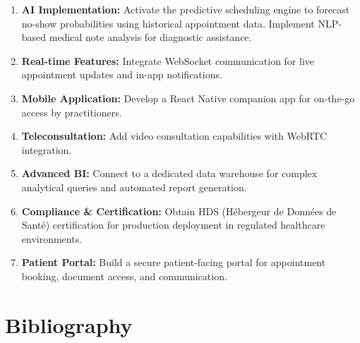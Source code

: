 \documentclass[12pt,a4paper,oneside]{report}
\begin{document}
\begin{enumerate}
    \item \textbf{AI Implementation:} Activate the predictive scheduling engine to forecast no-show probabilities using historical appointment data. Implement NLP-based medical note analysis for diagnostic assistance.
    \item \textbf{Real-time Features:} Integrate WebSocket communication for live appointment updates and in-app notifications.
    \item \textbf{Mobile Application:} Develop a React Native companion app for on-the-go access by practitioners.
    \item \textbf{Teleconsultation:} Add video consultation capabilities with WebRTC integration.
    \item \textbf{Advanced BI:} Connect to a dedicated data warehouse for complex analytical queries and automated report generation.
    \item \textbf{Compliance \& Certification:} Obtain HDS (Hébergeur de Données de Santé) certification for production deployment in regulated healthcare environments.
    \item \textbf{Patient Portal:} Build a secure patient-facing portal for appointment booking, document access, and communication.
\end{enumerate}


\chapter*{Bibliography}
\end{document}
